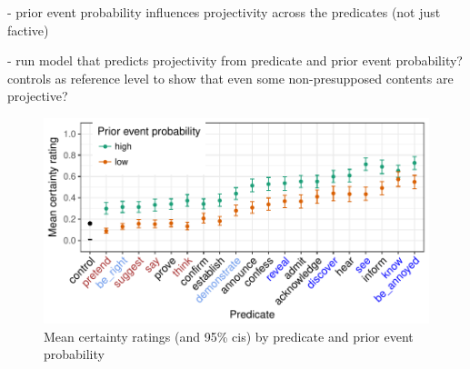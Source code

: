 \documentclass[12pt,fleqn]{article}
\newcommand{\6}{\mbox{$[\hspace*{-.6mm}[$}}
\newcommand{\9}{\mbox{$]\hspace*{-.6mm}]$}}
\begin{document}
- prior event probability influences projectivity across the predicates (not just factive)

- run model that predicts projectivity from predicate and prior event probability? controls as reference level to show that even some non-presupposed contents are projective?

\begin{figure}[h!]
\centering

\includegraphics[width=.5\paperwidth]{../results/3-projectivity/graphs/means-projectivity-by-predicate-and-facttype}

\caption{Mean certainty ratings (and 95\% cis) by predicate and prior event probability}
\label{f-projectivity}
\end{figure}

\newpage


\end{document}
